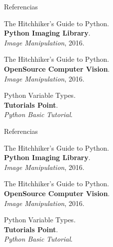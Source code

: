\documentclass[usenames,dvipsnames]{beamer}
\begin{document}
  \begin{frame}{Referencias}
    \begin{enumerate}[{[}1{]}]
      \addtocounter{enumi}{3}

      \item The Hitchhiker's Guide to Python.\\
      \textbf{Python Imaging Library}.\\
      \textit{Image Manipulation}, 2016.

      \item The Hitchhiker's Guide to Python.\\
      \textbf{OpenSource Computer Vision}.\\
      \textit{Image Manipulation}, 2016.

      \item Python Variable Types.\\
      \textbf{Tutorials Point}.\\
      \textit{Python Basic Tutorial}.
    \end{enumerate}
  \end{frame}

  \begin{frame}{Referencias}
    \begin{enumerate}[{[}1{]}]
      \addtocounter{enumi}{6}

      \item The Hitchhiker's Guide to Python.\\
      \textbf{Python Imaging Library}.\\
      \textit{Image Manipulation}, 2016.

      \item The Hitchhiker's Guide to Python.\\
      \textbf{OpenSource Computer Vision}.\\
      \textit{Image Manipulation}, 2016.

      \item Python Variable Types.\\
      \textbf{Tutorials Point}.\\
      \textit{Python Basic Tutorial}.
    \end{enumerate}
  \end{frame}
\end{document}
